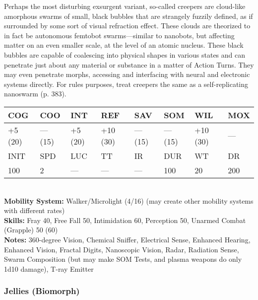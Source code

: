 Perhaps the most disturbing exsurgent variant, so-called creepers are cloud-like amorphous swarms of small, black bubbles that are strangely fuzzily defined, as if surrounded by some sort of visual refraction effect. These clouds are theorized to in fact be autonomous femtobot swarms—similar to nanobots, but affecting matter on an even smaller scale, at the level of an atomic nucleus. These black bubbles are capable of coalescing into physical shapes in various states and can penetrate just about any material or substance in a matter of Action Turns. They may even penetrate morphs, accessing and interfacing with neural and electronic systems directly. For rules purposes, treat creepers the same as a self-replicating nanoswarm (p. 383).\\ \begin{tabular}{|l|l|l|l|l|l|l|l|} \hline

COG &COO &INT &REF &SAV &SOM &WIL &MOX \\ \hline

+5 (20) &— (15) &+5 (20) &+10 (30) &— (15) &— (15) &+10 (30) &— \\ \hline

INIT &SPD &LUC &TT &IR &DUR &WT &DR \\ \hline

100 &2 &— &— &— &100 &20 &200 \\ \hline

\end{tabular} \\ \textbf{Mobility System: }Walker/Microlight (4/16) (may create other mobility systems with different rates) \\ \textbf{Skills:} Fray 40, Free Fall 50, Intimidation 60, Perception 50, Unarmed Combat (Grapple) 50 (60) \\ \textbf{Notes: }360-degree Vision, Chemical Sniffer, Electrical Sense, Enhanced Hearing, Enhanced Vision, Fractal Digits, Nanoscopic Vision, Radar, Radiation Sense, Swarm Composition (but may make SOM Tests, and plasma weapons do only 1d10 damage), T-ray Emitter 







\subsubsection{Jellies (Biomorph)} 

